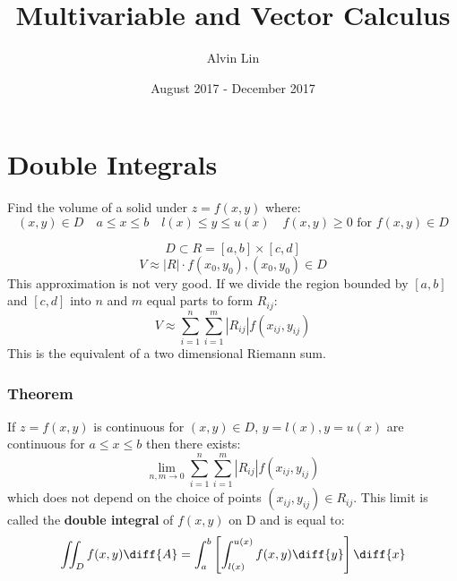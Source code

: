 \documentclass{math}
\title{Multivariable and Vector Calculus}
\author{Alvin Lin}
\date{August 2017 - December 2017}
\begin{document}
\maketitle

\section*{Double Integrals}
Find the volume of a solid under \( z = f(x,y) \) where:
\[ (x,y)\in D \quad a\le x\le b \quad l(x)\le y\le u(x) \quad
  f(x,y)\ge 0\text{ for }f(x,y)\in D \]
\begin{center}
\end{center}
\[ D \subset R = [a,b]\times[c,d] \]
\[ V \approx |R|\cdot f(x_0,y_0), (x_0,y_0)\in D \]
This approximation is not very good. If we divide the region bounded by
\( [a,b] \) and \( [c,d] \) into \( n \) and \( m \) equal parts to form
\( R_{ij} \):
\[ V \approx \sum_{i=1}^{n}\sum_{i=1}^{m}|R_{ij}|f(x_{ij},y_{ij}) \]
This is the equivalent of a two dimensional Riemann sum.

\subsubsection*{Theorem}
If \( z = f(x,y) \) is continuous for \( (x,y)\in D \), \( y = l(x), y = u(x)
\) are continuous for \( a\le x\le b \) then there exists:
\[ \lim_{n,m\to0}\sum_{i=1}^{n}\sum_{i=1}^{m}|R_{ij}|f(x_{ij},y_{ij}) \]
which does not depend on the choice of points \( (x_{ij},y_{ij})\in R_{ij} \).
This limit is called the \textbf{double integral} of \( f(x,y) \) on D and
is equal to:
\[ \iint_{D}f(x,y)\diff{A} =
  \int_{a}^{b}\left[\int_{l(x)}^{u(x)}f(x,y)\diff{y}\right]\diff{x} \]
\end{document}
